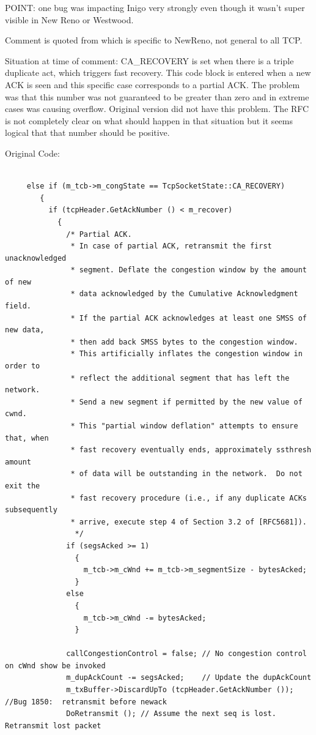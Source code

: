 \begin{figure}[h!]
\begin{center}
\end{center}
\caption{}
\label{fig:WNS3Bug}
\end{figure}

POINT: one bug was impacting Inigo very strongly even though it wasn't super visible in New Reno or Westwood. 

Comment is quoted from \cite{RFC2582} which is specific to NewReno, not general to all TCP. 

Situation at time of comment: CA\_RECOVERY is set when there is a triple duplicate act, which triggers fast recovery. This code block is entered when a new ACK is seen and this specific case corresponds to a partial ACK. The problem was that this number was not guaranteed to be greater than zero and in extreme cases was causing overflow. Original version did not have this problem. The RFC is not completely clear on what should happen in that situation but it seems logical that that number should be positive. 

Original Code:

\begin{verbatim}

     else if (m_tcb->m_congState == TcpSocketState::CA_RECOVERY)
        {
          if (tcpHeader.GetAckNumber () < m_recover)
            {
              /* Partial ACK.
               * In case of partial ACK, retransmit the first unacknowledged
               * segment. Deflate the congestion window by the amount of new
               * data acknowledged by the Cumulative Acknowledgment field.
               * If the partial ACK acknowledges at least one SMSS of new data,
               * then add back SMSS bytes to the congestion window.
               * This artificially inflates the congestion window in order to
               * reflect the additional segment that has left the network.
               * Send a new segment if permitted by the new value of cwnd.
               * This "partial window deflation" attempts to ensure that, when
               * fast recovery eventually ends, approximately ssthresh amount
               * of data will be outstanding in the network.  Do not exit the
               * fast recovery procedure (i.e., if any duplicate ACKs subsequently
               * arrive, execute step 4 of Section 3.2 of [RFC5681]).
                */
              if (segsAcked >= 1)
                {
                  m_tcb->m_cWnd += m_tcb->m_segmentSize - bytesAcked;
                }
              else
                {
                  m_tcb->m_cWnd -= bytesAcked;
                }

              callCongestionControl = false; // No congestion control on cWnd show be invoked
              m_dupAckCount -= segsAcked;    // Update the dupAckCount
              m_txBuffer->DiscardUpTo (tcpHeader.GetAckNumber ());  //Bug 1850:  retransmit before newack
              DoRetransmit (); // Assume the next seq is lost. Retransmit lost packet

\end{verbatim}

